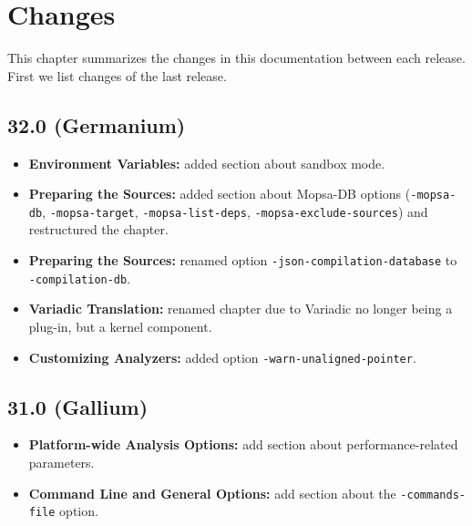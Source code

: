 \chapter{Changes}\label{chap:changes}

This chapter summarizes the changes in this documentation between each \FramaC
release. First we list changes of the last release.


\section*{32.0 (Germanium)}
\begin{itemize}
\item \textbf{Environment Variables:} added section about sandbox mode.
\item \textbf{Preparing the Sources:} added section about Mopsa-DB options
  (\texttt{-mopsa-db}, \texttt{-mopsa-target}, \texttt{-mopsa-list-deps},
  \texttt{-mopsa-exclude-sources}) and restructured the chapter.
\item \textbf{Preparing the Sources:} renamed option
  \texttt{-json-compilation-database} to \texttt{-compilation-db}.
\item \textbf{Variadic Translation:} renamed chapter due to Variadic no
  longer being a plug-in, but a kernel component.
\item \textbf{Customizing Analyzers:} added option
  \texttt{-warn-unaligned-pointer}.
\end{itemize}

\section*{31.0 (Gallium)}
\begin{itemize}
\item  \textbf{Platform-wide Analysis Options:} add section about
  performance-related parameters.
\item \textbf{\FramaC Command Line and General Options:} add section about the
  \texttt{-commands-file} option.
\end{itemize}

